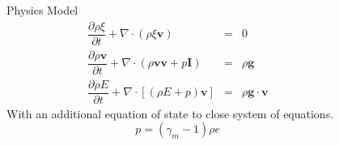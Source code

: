 \documentclass[final]{beamer}
\newlength{\sepwid}
\newlength{\onecolwid}
\begin{document}
\begin{frame}[t]
\begin{columns}[t]
\begin{column}{\onecolwid}
\begin{block}{Physics Model \cite{suzuki2005numerical}}
\begin{eqnarray}
\dfrac{\partial \rho \xi}{\partial t} + \nabla \cdot (\rho \xi \textbf{v}) &=& 0 \label{eq:gov-cs-ks}\\
\dfrac{\partial \rho \textbf{v}}{\partial t} + \nabla \cdot (\rho \textbf{v} \textbf{v} + p\textbf{I}) &=& \rho \textbf{g} \label{eq:gov-cs-v} \\
\dfrac{\partial \rho E}{\partial t} + \nabla \cdot [(\rho E + p )\textbf{v}] &=& \rho \textbf{g} \cdot\textbf{v} \label{eq:gov-cs-e}
\end{eqnarray}
With an additional equation of state to close system of equations.
\begin{equation}
p = (\gamma_m - 1)\rho e \label{eq:EOS}
\end{equation}

\end{block}
\end{column} %
\begin{column}{\sepwid}\end{column} %

\begin{column}{\onecolwid}\vspace{-.6in} 


\end{column}
\end{columns}
\end{frame}
\end{document}
